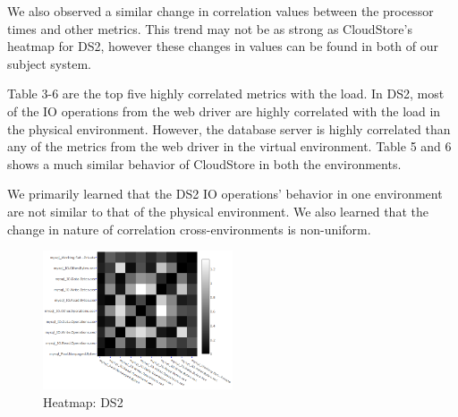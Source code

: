 We also observed a similar change in correlation values between the processor times and other metrics. This trend may not be as strong as CloudStore's heatmap for DS2, however these changes in values can be found in both of our subject system.

Table 3-6 are the top five highly correlated metrics with the load. In DS2, most of the IO operations from the web driver are highly correlated with the load in the physical environment. However, the database server is highly correlated than any of the metrics from the web driver in the virtual environment.
Table 5 and 6 shows a much similar behavior of CloudStore in both the environments.

We primarily learned that the DS2 IO operations' behavior in one environment are not similar to that of the physical environment. We also learned that the change in nature of correlation cross-environments is non-uniform.



\begin{figure}[tbh]
	\centering	
	\includegraphics[width=0.5\textwidth]{figures/ds2_smaller_new.png}
	\caption{Heatmap: DS2}
	\label{fig:Results Table}
\end{figure}

